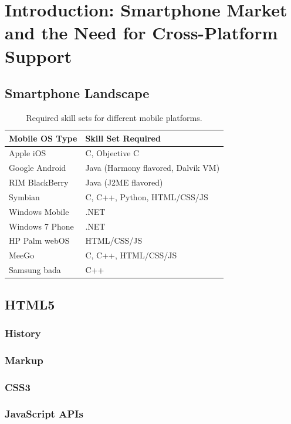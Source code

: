 \chapter{Introduction: Smartphone Market and the Need for Cross-Platform Support}
\label{chapter:introduction}

\section{Smartphone Landscape}
\label{section:smartphone-landscape}

\begin{table}
  \begin{tabular}{ l | l }
    \textbf{Mobile OS Type} & \textbf{Skill Set Required} \\
    \hline
    Apple iOS & C, Objective C \\
    Google Android & Java (Harmony flavored, Dalvik VM) \\
    RIM BlackBerry & Java (J2ME flavored) \\
    Symbian & C, C++, Python, HTML/CSS/JS \\
    Windows Mobile & .NET \\
    Windows 7 Phone & .NET \\
    HP Palm webOS & HTML/CSS/JS \\
    MeeGo & C, C++, HTML/CSS/JS \\
    Samsung bada & C++
  \end{tabular}
  \label{table:native-skills}
  \caption{Required skill sets for different mobile platforms. \cite{charland2011mobile}}
\end{table}

\section{HTML5}
\label{section:html5}

\subsection{History}
\subsection{Markup}
\subsection{CSS3}
\subsection{JavaScript APIs}
